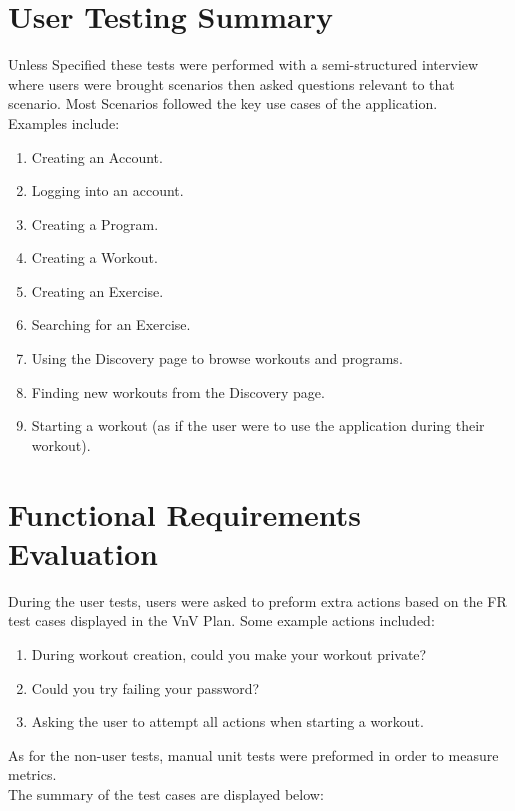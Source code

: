 \documentclass[12pt, titlepage]{article}
\begin{document}
\section{User Testing Summary}
Unless Specified these tests were performed with a semi-structured interview where users were brought scenarios then asked questions relevant to that scenario. Most Scenarios followed the key use cases of the application.\\
Examples include:
\begin{enumerate}
	\item Creating an Account.
	\item Logging into an account.
	\item Creating a Program.
	\item Creating a Workout.
	\item Creating an Exercise.
	\item Searching for an Exercise.
	\item Using the Discovery page to browse workouts and programs.
	\item Finding new workouts from the Discovery page.
	\item Starting a workout (as if the user were to use the application during their workout).
\end{enumerate}

\section{Functional Requirements Evaluation}


\noindent During the user tests, users were asked to preform extra actions based on the FR test cases displayed in the VnV Plan.
Some example actions included: \\
\begin{enumerate}
    \item During workout creation, could you make your workout private?
    \item Could you try failing your password?
    \item Asking the user to attempt all actions when starting a workout.
\end{enumerate}


\noindent As for the non-user tests, manual unit tests were preformed in order to measure metrics.\\


\noindent The summary of the test cases are displayed below:
\end{document}
